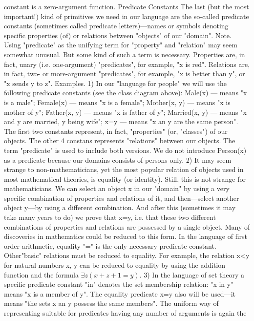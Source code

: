 constant is a zero-argument function.
Predicate Constants
The last (but the most important!) kind of primitives we need in our language are the so-called predicate
constants (sometimes called predicate letters)---names or symbols denoting specific properties (of) or
relations between "objects" of our "domain".
Note. Using "predicate" as the unifying term for "property" and "relation" may seem somewhat unusual.
But some kind of such a term is necessary. Properties are, in fact, unary (i.e. one-argument) "predicates",
for example, "x is red". Relations are, in fact, two- or more-argument "predicates", for example, "x is
better than y", or "x sends y to z".
Examples. 1) In our "language for people" we will use the following predicate constants (see the class diagram above):
Male(x) --- means "x is a male";
Female(x) --- means "x is a female";
Mother(x, y) --- means "x is mother of y";
Father(x, y) --- means "x is father of y";
Married(x, y) --- means "x and y are married, y being wife";
x=y --- means "x an y are the same person".
The first two constants represent, in fact, "properties" (or, "classes") of our objects. The other 4 constans represents "relations"
between our objects. The term "predicate" is used to include both versions. We do not introduce Person(x) as a predicate
because our domains consists of persons only.
2) It may seem strange to non-mathematicians, yet the most popular relation of objects used in most mathematical theories, is
equality (or identity). Still, this is not strange for mathematicians. We can select an object x in our "domain" by using a very
specific combination of properties and relations of it, and then---select another object y---by using a different combination.
And after this (sometimes it may take many years to do) we prove that x=y, i.e. that these two different combinations of
properties and relations are possessed by a single object. Many of discoveries in mathematics could be reduced to this form.
In the language of first order arithmetic, equality "=" is the only necessary predicate constant. Other"basic" relations must be
reduced to equality. For example, the relation x<y for natural numbers x, y can be reduced to equality by using the addition
function and the formula \(\exists z(x+z+1=y)\).
3) In the language of set theory a specific predicate constant "in" denotes the set membership relation: "x in y" means "x is a
member of y". The equality predicate x=y also will be used---it means "the sets x an y possess the same members".
The uniform way of representing suitable for predicates having any number of arguments is again the
